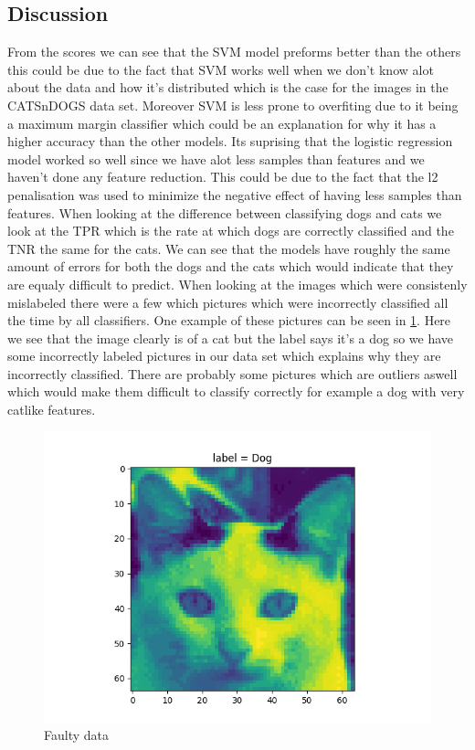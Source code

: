 \documentclass{article}
\begin{document}
\subsection{Discussion}
From the scores we can see that the SVM model preforms better than the others this could be due to the fact that SVM works well when we don't know alot about the data and how it's distributed which is the case for the images in the CATSnDOGS data set. Moreover SVM is less prone to overfiting due to it being a maximum margin classifier which could be an explanation for why it has a higher accuracy than the other models. Its suprising that the logistic regression model worked so well since we have alot less samples than features and we haven't done any feature reduction. This could be due to the fact that the l2 penalisation was used to minimize the negative effect of having less samples than features. When looking at the difference between classifying dogs and cats we look at the TPR which is the rate at which dogs are correctly classified and the TNR the same for the cats. We can see that the models have roughly the same amount of errors for both the dogs and the cats which would indicate that they are equaly difficult to predict. When looking at the images which were consistenly mislabeled there were a few which pictures which were incorrectly classified all the time by all classifiers. One example of these pictures can be seen in \ref{faulty data}. Here we see that the image clearly is of a cat but the label says it's a dog so we have some incorrectly labeled pictures in our data set which explains why they are incorrectly classified. There are probably some pictures which are outliers aswell which would make them difficult to classify correctly for example a dog with very catlike features. 
\begin{figure}[H]
    \centering
    \includegraphics[scale=0.5]{1a/Dirty data.png}
    \caption{Faulty data}
    \label{faulty data}
\end{figure}
\newpage
\end{document}
